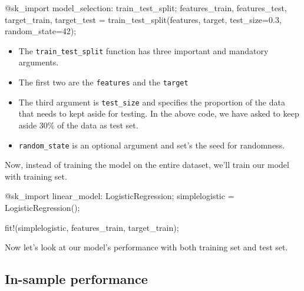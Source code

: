 \documentclass[
  letterpaper,
]{book}
\newenvironment{Shaded}{\begin{snugshade}}{\end{snugshade}}
\newcommand{\FloatTok}[1]{\textcolor[rgb]{0.68,0.00,0.00}{#1}}
\newcommand{\FunctionTok}[1]{\textcolor[rgb]{0.28,0.35,0.67}{#1}}
\newcommand{\NormalTok}[1]{\textcolor[rgb]{0.00,0.23,0.31}{#1}}
\newcommand{\OperatorTok}[1]{\textcolor[rgb]{0.37,0.37,0.37}{#1}}
\newcommand{\PreprocessorTok}[1]{\textcolor[rgb]{0.68,0.00,0.00}{#1}}
\providecommand{\tightlist}{%
  \setlength{\itemsep}{0pt}\setlength{\parskip}{0pt}}\usepackage{longtable,booktabs,array}
\begin{document}
\begin{Shaded}
\begin{Highlighting}[]
\PreprocessorTok{@sk\_import}\NormalTok{ model\_selection}\OperatorTok{:}\NormalTok{ train\_test\_split;}
\NormalTok{features\_train, features\_test, }
\NormalTok{    target\_train, target\_test }\OperatorTok{=} \FunctionTok{train\_test\_split}\NormalTok{(features, }
\NormalTok{        target, test\_size}\OperatorTok{=}\FloatTok{0.3}\NormalTok{, random\_state}\OperatorTok{=}\FloatTok{42}\NormalTok{);}
\end{Highlighting}
\end{Shaded}

\begin{itemize}
\tightlist
\item
  The \texttt{train\_test\_split} function has three important and
  mandatory arguments.
\item
  The first two are the \texttt{features} and the \texttt{target}
\item
  The third argument is \texttt{test\_size} and specifies the proportion
  of the data that needs to kept aside for testing. In the above code,
  we have asked to keep aside 30\% of the data as test set.\\
\item
  \texttt{random\_state} is an optional argument and set's the seed for
  randomness.
\end{itemize}

Now, instead of training the model on the entire dataset, we'll train
our model with training set.

\begin{Shaded}
\begin{Highlighting}[]
\PreprocessorTok{@sk\_import}\NormalTok{ linear\_model}\OperatorTok{:}\NormalTok{ LogisticRegression;}
\NormalTok{simplelogistic }\OperatorTok{=} \FunctionTok{LogisticRegression}\NormalTok{();}

\FunctionTok{fit!}\NormalTok{(simplelogistic, features\_train, target\_train);}
\end{Highlighting}
\end{Shaded}

Now let's look at our model's performance with both training set and
test set.

\hypertarget{in-sample-performance}{%
\subsection*{In-sample performance}\label{in-sample-performance}}
\end{document}
